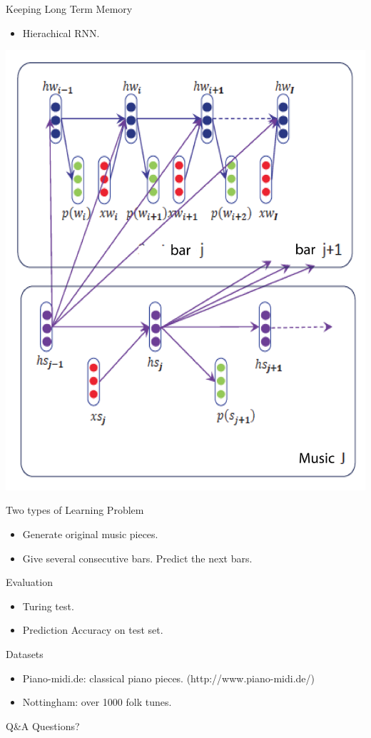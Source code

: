 \documentclass{beamer}
\begin{document}
\begin{frame}{Keeping Long Term Memory}
  \begin{itemize}
    \item
    Hierachical RNN.
  \end{itemize}
  \begin{center}
  \includegraphics[scale=0.1]{hierarchical1.png}
  \end{center}
\end{frame}

\begin{frame}{Two types of Learning Problem}
  \begin{itemize}
    \item Generate original music pieces.
    \item Give several consecutive bars. Predict the next bars.
  \end{itemize}
\end{frame}

\begin{frame}{Evaluation}
  \begin{itemize}
    \item Turing test.
    \item Prediction Accuracy on test set.
  \end{itemize}
\end{frame}

\begin{frame}{Datasets}
\begin{itemize}
\item
Piano-midi.de: classical piano pieces. (http://www.piano-midi.de/)
\item
Nottingham: over 1000 folk tunes.
\end{itemize}
\end{frame}

\begin{frame}{Q\&A}
  Questions?
\end{frame}
\end{document}
